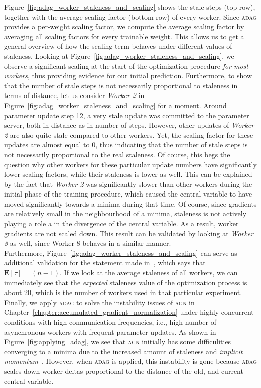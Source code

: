 \newpage
Figure~\ref{fig:adag_worker_staleness_and_scaling} shows the stale steps (top row), together with the average scaling factor (bottom row) of every worker. Since \textsc{adag} provides a per-weight scaling factor, we compute the average scaling factor by averaging all scaling factors for every trainable weight. This allows us to get a general overview of how the scaling term behaves under different values of staleness. Looking at Figure~\ref{fig:adag_worker_staleness_and_scaling}, we observe a significant scaling at the start of the optimization procedure \emph{for most workers}, thus providing evidence for our initial prediction. Furthermore, to show that the number of stale steps is not necessarily proportional to staleness in terms of distance, let us consider \emph{Worker 2} in Figure~\ref{fig:adag_worker_staleness_and_scaling} for a moment. Around parameter update step 12, a very stale update was committed to the parameter server, both in distance as in number of steps. However, other updates of \emph{Worker 2} are also quite stale compared to other workers. Yet, the scaling factor for these updates are almost equal to 0, thus indicating that the number of stale steps is not necessarily proportional to the real staleness. Of course, this begs the question why other workers for these particular update numbers have significantly lower scaling factors, while their staleness is lower as well. This can be explained by the fact that \emph{Worker 2} was significantly slower than other workers during the initial phase of the training procedure, which caused the central variable to have moved significantly towards a minima during that time. Of course, since gradients are relatively small in the neighbourhood of a minima, staleness is not actively playing a role a in the divergence of the central variable. As a result, worker gradients are not scaled down. This result can be validated by looking at \emph{Worker 8} as well, since Worker 8 behaves in a similar manner.\\

Furthermore, Figure~\ref{fig:adag_worker_staleness_and_scaling} can serve as additional validation for the statement made in~\cite{implicitmomentum}, which says that $\textbf{E}[\tau] = (n - 1)$. If we look at the average staleness of all workers, we can immediately see that the \emph{expected} staleness value of the optimization process is about 20, which is the number of workers used in that particular experiment.\\

Finally, we apply \textsc{adag} to solve the instability issues of \textsc{agn} in Chapter~\ref{chapter:accumulated_gradient_normalization} under highly concurrent conditions with high communication frequencies, i.e., high number of asynchronous workers with frequent parameter updates. As shown in Figure~\ref{fig:applying_adag}, we see that \textsc{agn} initially has some difficulities converging to a minima due to the increased amount of staleness and \emph{implicit momentum}~\cite{implicitmomentum}. However, when \textsc{adag} is applied, this instability is gone because \textsc{adag} scales down worker deltas proportional to the distance of the old, and current central variable.

